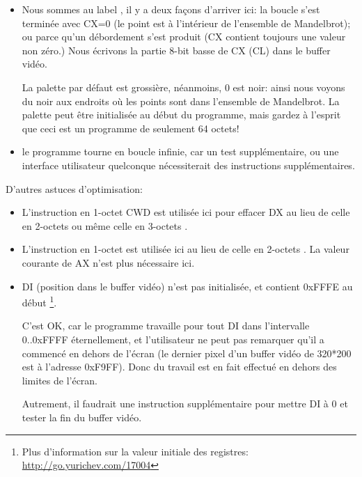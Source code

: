 \begin{itemize}
\begin{itemize}
    \end{itemize}

\item Nous sommes au label , il y a deux façons d'arriver ici:
la boucle s'est terminée avec CX=0 (le point est à l'intérieur de l'ensemble de Mandelbrot);
ou parce qu'un débordement s'est produit (CX contient toujours une valeur non zéro.)
Nous écrivons la partie 8-bit basse de CX (CL) dans le buffer vidéo.

La palette par défaut est grossière, néanmoins, 0 est noir: ainsi nous voyons du noir
aux endroits où les points sont dans l'ensemble de Mandelbrot.
La palette peut être initialisée au début du programme, mais gardez à l'esprit que
ceci est un programme de seulement 64 octets!

\item le programme tourne en boucle infinie, car un test supplémentaire, ou une interface
utilisateur quelconque nécessiterait des instructions supplémentaires.

\end{itemize}

D'autres astuces d'optimisation:

\begin{itemize}
\item L'instruction en 1-octet CWD est utilisée ici
pour effacer DX au lieu de celle en 2-octets  ou même celle en 3-octets .

\item L'instruction en 1-octet  est utilisée ici au lieu de celle en 2-octets
. 
La valeur courante de AX n'est plus nécessaire ici.

\item DI (position dans le buffer vidéo) n'est pas initialisée, et contient 0xFFFE au début
\footnote{Plus d'information sur la valeur initiale des registres:
\url{http://go.yurichev.com/17004}}.

C'est OK, car le programme travaille pour tout DI dans l'intervalle 0..0xFFFF éternellement,
et l'utilisateur ne peut pas remarquer qu'il a commencé en dehors de l'écran (le
dernier pixel d'un buffer vidéo de 320*200 est à l'adresse 0xF9FF).
Donc du travail est en fait effectué en dehors des limites de l'écran.

Autrement, il faudrait une instruction supplémentaire pour mettre DI à 0 et tester
la fin du buffer vidéo.

\end{itemize}

